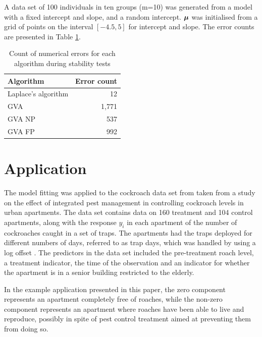 \documentclass[times, doublespace]{anzsauth}
\begin{document}
	\noindent A data set of 100 individuals in ten groups (m=10) was generated from a model with a fixed intercept
	and slope, and a random intercept. ${\boldsymbol \mu}$ was initialised from a grid of points on the interval
	$[-4.5, 5]$ for intercept and slope. The error counts are presented in Table
	\ref{tab:stability_results}.
	
	\begin{table}
		\caption{Count of numerical errors for each algorithm during stability tests}
		\label{tab:stability_results}
		\begin{tabular}{|l|r|}
			\hline
			Algorithm           & Error count \\
			\hline
			Laplace's algorithm & 12          \\
			GVA                 & 1,771       \\
			GVA NP              & 537         \\
			GVA FP              & 992         \\
			\hline
		\end{tabular}
	\end{table}
	
	\section{Application}
	\label{sec:application}
	
	
	The model fitting was applied to the cockroach data set from \cite{Gelman2007} taken from a study on the
	effect of integrated pest management in controlling cockroach levels in urban apartments. The data set
	contains data on 160 treatment and 104 control apartments, along with the response $y_i$ in each apartment of
	the number of cockroaches caught in a set of traps. The apartments had the traps deployed for different
	numbers of days, referred to as trap days, which was handled by using a log offset \cite{Agresti2002}. The
	predictors in the data set included the pre-treatment roach level, a treatment indicator, the time of the
	observation and an indicator for whether the apartment is in a senior building restricted to the elderly.
	
	\noindent In the example application presented in this paper, the zero component represents an apartment completely free of roaches, while the non-zero component represents an apartment where roaches have been able to live and reproduce, possibly in spite of pest control treatment aimed at preventing them from doing so.
	
\end{document}

